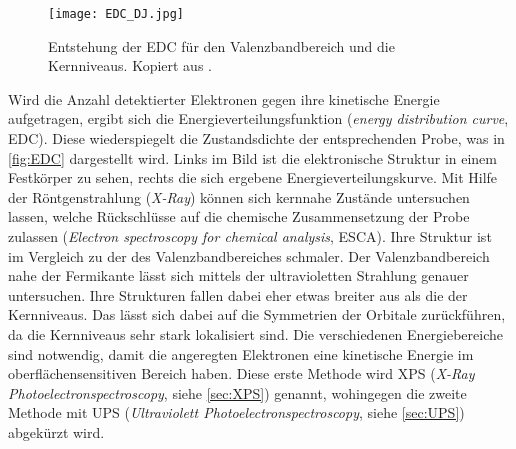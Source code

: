         \begin{figure}
            \centering
            \texttt{[image: EDC\_DJ.jpg]}
            \caption{Entstehung der EDC für den Valenzbandbereich und die Kernniveaus.
            Kopiert aus \cite{oura_surface_2003}.}
            \label{fig:EDC}
        \end{figure}
        Wird die Anzahl detektierter Elektronen gegen ihre kinetische Energie aufgetragen, ergibt sich die Energieverteilungsfunktion (\textit{energy distribution curve}, EDC).
        Diese wiederspiegelt die Zustandsdichte der entsprechenden Probe, was in \autoref{fig:EDC} dargestellt wird.
        Links im Bild ist die elektronische Struktur in einem Festkörper zu sehen, rechts die sich ergebene Energieverteilungskurve.
        Mit Hilfe der Röntgenstrahlung (\textit{X-Ray}) können sich kernnahe Zustände untersuchen lassen, welche Rückschlüsse auf die chemische Zusammensetzung der Probe zulassen (\textit{Electron spectroscopy for chemical analysis}, ESCA).
        Ihre Struktur ist im Vergleich zu der des Valenzbandbereiches schmaler.
        Der Valenzbandbereich nahe der Fermikante lässt sich mittels der ultravioletten Strahlung genauer untersuchen.
        Ihre Strukturen fallen dabei eher etwas breiter aus als die der Kernniveaus.
        Das lässt sich dabei auf die Symmetrien der Orbitale zurückführen, da die Kernniveaus sehr stark lokalisiert sind.
        Die verschiedenen Energiebereiche sind notwendig, damit die angeregten Elektronen eine kinetische Energie im oberflächensensitiven Bereich haben.
        Diese erste Methode wird XPS (\textit{X-Ray Photoelectronspectroscopy}, siehe \autoref{sec:XPS}) genannt, wohingegen die zweite Methode mit UPS (\textit{Ultraviolett Photoelectronspectroscopy}, siehe \autoref{sec:UPS}) abgekürzt wird.
        

